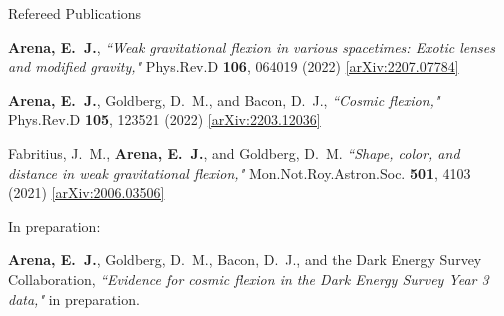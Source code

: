 \documentclass{resume} %
\begin{document}
\begin{rSection}{Refereed Publications}

\begin{etaremune}

\item \textbf{{Arena}, E.~J.}, \textit{``Weak gravitational flexion in various spacetimes: Exotic lenses and modified gravity,"} Phys.Rev.D \textbf{106}, 064019 (2022) \href{https://arxiv.org/abs/2207.07784}{[arXiv:2207.07784]}
    
\item \textbf{{Arena}, E.~J.}, {Goldberg}, D.~M., and {Bacon}, D.~J., \textit{``Cosmic flexion,"} Phys.Rev.D \textbf{105}, 123521 (2022) \href{https://arxiv.org/abs/2203.12036}{[arXiv:2203.12036]}
  
\item {Fabritius}, J.~M., \textbf{{Arena}, E.~J.}, and {Goldberg}, D.~M. \textit{``Shape, color, and distance in weak gravitational flexion,"} Mon.Not.Roy.Astron.Soc. \textbf{501}, 4103 (2021) \href{https://arxiv.org/abs/2006.03506}{[arXiv:2006.03506]}
\end{etaremune}

In preparation:
\begin{etaremune}
\item \textbf{{Arena}, E.~J.}, {Goldberg}, D.~M., {Bacon}, D.~J., and the Dark Energy Survey Collaboration, \textit{``Evidence for cosmic flexion in the Dark Energy Survey Year 3 data,"} in preparation.
 \end{etaremune}

\end{rSection}


\newpage
\end{document}
